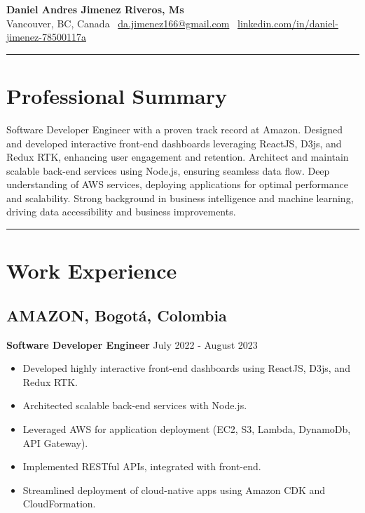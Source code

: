\documentclass[11pt,a4paper]{article}
\begin{document}
\titlespacing*{\section}{0pt}{0pt}{10pt} 
\titlespacing*{\subsection}{0pt}{10pt}{5pt} 

\pagestyle{empty}

{
\centering
{\Huge\textbf{Daniel Andres Jimenez Riveros, Ms}}\\
\medskip 
Vancouver, BC, Canada \textbar\ \href{mailto:da.jimenez166@gmail.com}{da.jimenez166@gmail.com} \textbar\ \href{https://www.linkedin.com/in/daniel-jimenez-78500117a/}{linkedin.com/in/daniel-jimenez-78500117a}\\
}

\rule{\textwidth}{0.4pt} 

\section*{Professional Summary}
Software Developer Engineer with a proven track record at Amazon. Designed and developed interactive front-end dashboards leveraging ReactJS, D3js, and Redux RTK, enhancing user engagement and retention. Architect and maintain scalable back-end services using Node.js, ensuring seamless data flow. Deep understanding of AWS services, deploying applications for optimal performance and scalability. Strong background in business intelligence and machine learning, driving data accessibility and business improvements.

\rule{\textwidth}{0.4pt} 

\section*{Work Experience}

\subsection*{AMAZON, Bogotá, Colombia}
\textbf{Software Developer Engineer} \hfill July 2022 - August 2023
\begin{itemize}[noitemsep]
    \item Developed highly interactive front-end dashboards using ReactJS, D3js, and Redux RTK.
    \item Architected scalable back-end services with Node.js.
    \item Leveraged AWS for application deployment (EC2, S3, Lambda, DynamoDb, API Gateway).
    \item Implemented RESTful APIs, integrated with front-end.
    \item Streamlined deployment of cloud-native apps using Amazon CDK and CloudFormation.
\end{itemize}
\end{document}
